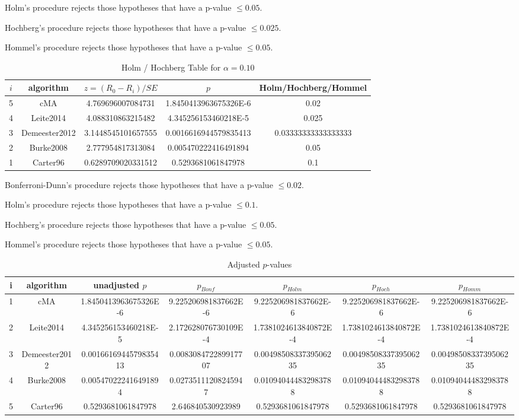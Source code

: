 \documentclass[a4paper,10pt]{article}
\begin{document}
\begin{landscape}
Holm's procedure rejects those hypotheses that have a p-value $\le0.05$.


Hochberg's procedure rejects those hypotheses that have a p-value $\le0.025$.


Hommel's procedure rejects those hypotheses that have a p-value $\le0.05$.


\begin{table}[!htp]
\centering\tiny
\caption{Holm / Hochberg Table for $\alpha=0.10$}
\begin{tabular}{ccccc}
$i$&algorithm&$z=(R_0 - R_i)/SE$&$p$&Holm/Hochberg/Hommel\\
\hline
5&cMA&4.769696007084731&1.8450413963675326E-6&0.02\\
4&Leite2014&4.088310863215482&4.345256153460218E-5&0.025\\
3&Demeester2012&3.1448545101657555&0.0016616944579835413&0.03333333333333333\\
2&Burke2008&2.777954817313084&0.005470222416491894&0.05\\
1&Carter96&0.6289709020331512&0.5293681061847978&0.1\\
\hline
\end{tabular}
\end{table}
Bonferroni-Dunn's procedure rejects those hypotheses that have a p-value $\le0.02$.


Holm's procedure rejects those hypotheses that have a p-value $\le0.1$.


Hochberg's procedure rejects those hypotheses that have a p-value $\le0.05$.


Hommel's procedure rejects those hypotheses that have a p-value $\le0.05$.


\begin{table}[!htp]
\centering\tiny
\caption{Adjusted $p$-values}
\begin{tabular}{ccccccc}
i&algorithm&unadjusted $p$&$p_{Bonf}$&$p_{Holm}$&$p_{Hoch}$&$p_{Homm}$\\
\hline
1&cMA&1.8450413963675326E-6&9.225206981837662E-6&9.225206981837662E-6&9.225206981837662E-6&9.225206981837662E-6\\
2&Leite2014&4.345256153460218E-5&2.172628076730109E-4&1.7381024613840872E-4&1.7381024613840872E-4&1.7381024613840872E-4\\
3&Demeester2012&0.0016616944579835413&0.008308472289917707&0.0049850833739506235&0.0049850833739506235&0.0049850833739506235\\
4&Burke2008&0.005470222416491894&0.02735111208245947&0.010940444832983788&0.010940444832983788&0.010940444832983788\\
5&Carter96&0.5293681061847978&2.646840530923989&0.5293681061847978&0.5293681061847978&0.5293681061847978\\
\hline
\end{tabular}
\end{table}


\end{landscape}
\end{document}
